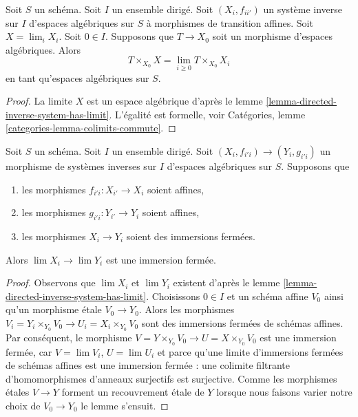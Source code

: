 \begin{lemma}
\label{lemma-space-over-limit}
Soit $S$ un schéma. Soit $I$ un ensemble dirigé.
Soit $(X_i, f_{ii'})$ un système inverse sur $I$ d'espaces algébriques
sur $S$ à morphismes de transition affines.
Soit $X = \lim_i X_i$. Soit $0 \in I$. Supposons que $T \to X_0$ soit un
morphisme d'espaces algébriques. Alors
$$
T \times_{X_0} X = \lim_{i \geq 0} T \times_{X_0} X_i
$$
en tant qu'espaces algébriques sur $S$.
\end{lemma}

\begin{proof}
La limite $X$ est un espace algébrique d'après
le lemme \ref{lemma-directed-inverse-system-has-limit}.
L'égalité est formelle, voir
Catégories, lemme \ref{categories-lemma-colimits-commute}.
\end{proof}

\begin{lemma}
\label{lemma-directed-inverse-system-closed-immersions}
Soit $S$ un schéma. Soit $I$ un ensemble dirigé.
Soit $(X_i, f_{i'i}) \to (Y_i, g_{i'i})$ un morphisme
de systèmes inverses sur $I$ d'espaces algébriques sur $S$.
Supposons que
\begin{enumerate}
\item les morphismes $f_{i'i} : X_{i'} \to X_i$ soient affines,
\item les morphismes $g_{i'i} : Y_{i'} \to Y_i$ soient affines,
\item les morphismes $X_i \to Y_i$ soient des immersions fermées.
\end{enumerate}
Alors $\lim X_i \to \lim Y_i$ est une immersion fermée.
\end{lemma}

\begin{proof}
Observons que $\lim X_i$ et $\lim Y_i$ existent d'après
le lemme \ref{lemma-directed-inverse-system-has-limit}.
Choisissons $0 \in I$ et un schéma affine $V_0$ ainsi qu'un morphisme \'etale
$V_0 \to Y_0$. Alors les morphismes
$V_i = Y_i \times_{Y_0} V_0 \to U_i = X_i \times_{Y_0} V_0$
sont des immersions fermées de schémas affines.
Par conséquent, le morphisme $V = Y \times_{Y_0} V_0 \to U = X \times_{Y_0} V_0$
est une immersion fermée, car $V = \lim V_i$, $U = \lim U_i$
et parce qu'une limite d'immersions fermées de schémas affines est une
immersion fermée : une colimite filtrante d'homomorphismes d'anneaux surjectifs
est surjective. Comme les morphismes \'etales $V \to Y$ forment un
recouvrement \'etale de $Y$ lorsque nous faisons varier notre choix de $V_0 \to Y_0$
le lemme s'ensuit.
\end{proof}


